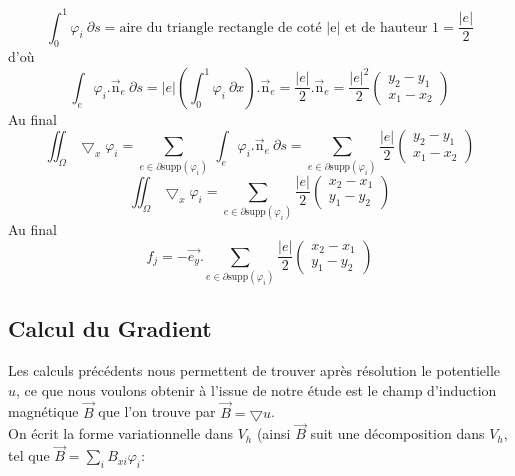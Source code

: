 \documentclass[a4paper,12pt,titlepage]{report}
\begin{document}
\begin{onehalfspace}
\[
	\int_{0}^{1}\varphi_{i}\ \partial s  = \text{aire du triangle rectangle de coté |e| et de hauteur 1} = \frac{|e|}{2}
\]
d'où
\[
	\int_{e}\varphi_{i}.\vec{\text{n}}_{e}\ \partial s =
	|e|(\int_{0}^{1}\varphi_{i}\ \partial x ).\vec{\text{n}}_{e} =
	\frac{|e|}{2}.\vec{\text{n}}_{e} = 
	\frac{|e|^{2}}{2}
	\begin{pmatrix}
		y_{2}-y_{1} \\
		x_{1}-x_{2}
	\end{pmatrix}	
\] 
Au final
\[
	\iint_{\Omega}\bigtriangledown_{x}{\varphi_{i}} =
	\sum_{e \in \partial \text{supp}(\varphi_{i})}\ \int_{e}\varphi_{i}.\vec{\text{n}}_{e}\ \partial s =
	\sum_{e \in \partial\text{supp}(\varphi_{i})}
	\frac{|e|}{2}
	\begin{pmatrix}
		y_{2}-y_{1} \\
		x_{1}-x_{2}
	\end{pmatrix}
\]
\[
	\iint_{\Omega}\bigtriangledown_{x}{\varphi_{i}} =
	\sum_{e \in \partial \text{supp}(\varphi_{i})}
	\frac{|e|}{2}
	\begin{pmatrix}
		x_{2}-x_{1} \\
		y_{1}-y_{2}
	\end{pmatrix}
\]
Au final 
\[\boxed{f_{j} =  -\vec{e_{y}}.\sum_{e \in \partial \text{supp}(\varphi_{i})}
	\frac{|e|}{2}
	\begin{pmatrix}
		x_{2}-x_{1} \\
		y_{1}-y_{2}
	\end{pmatrix}}
\]

				

\subsection{Calcul du Gradient}

Les calculs précédents nous permettent de trouver après résolution le potentielle $u$, ce que nous voulons obtenir à l'issue de notre étude est le champ d'induction magnétique $\vec{B}$ que l'on trouve par $\vec{B}= \bigtriangledown u$.
\\
\newline  On écrit la forme variationnelle dans $V_{h}$ (ainsi $\vec{B}$ suit une décomposition dans $V_h$, tel que $\vec{B}=\sum_{i} B_{xi}\varphi_i:$


\end{onehalfspace}
\end{document}
